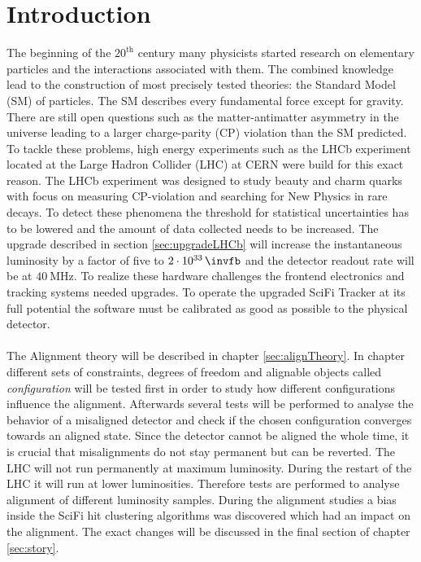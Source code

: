 \chapter{Introduction}
\label{sec:einleitung}

The beginning of the $20^{\text{th}}$ century many physicists started research on
elementary particles and the interactions associated with them. The combined
knowledge lead to the construction of most precisely tested theories: the
Standard Model (SM) of particles.
The SM describes every fundamental force except for gravity. There are still open
questions such as the matter-antimatter asymmetry in the universe leading to a larger
charge-parity (CP) violation than the SM predicted.
To tackle these problems, high energy experiments such as the LHCb experiment located at the Large Hadron Collider (LHC) at CERN were build for this exact reason.
The LHCb experiment was designed to study beauty and charm quarks with focus on measuring CP-violation and searching for New Physics in rare decays.
To detect these phenomena the threshold for statistical uncertainties has to
be lowered and the amount of data collected needs to be increased. The upgrade
described in section \ref{sec:upgradeLHCb} will increase the instantaneous
luminosity by a factor of five to $\SI{2e33}{\invfb}$ and
the detector readout rate will be at $\SI{40}{\mega\hertz}$. To realize these
hardware challenges the frontend electronics and tracking systems needed upgrades.
To operate the upgraded SciFi Tracker at its full potential the software must be
calibrated as good as possible to the physical detector.
\\
\\
The Alignment theory will be described in chapter \ref{sec:alignTheory}.
In chapter \label{sec:story} different sets of constraints, degrees of freedom
and alignable objects called \textit{configuration} will be tested first in order
to study how different configurations influence the alignment. Afterwards several
tests will be performed to analyse the behavior of a misaligned detector and check
if the chosen configuration converges towards an aligned state. Since the detector
cannot be aligned the whole time, it is crucial that misalignments do not stay
permanent but can be reverted.
The LHC will not run permanently at maximum luminosity. During the restart of the LHC it will run at lower luminosities. Therefore tests are performed to analyse alignment of different luminosity samples. During the alignment studies a bias inside the SciFi hit clustering algorithms was discovered which had an impact on the alignment. The exact changes will be discussed in the final section of chapter \ref{sec:story}.
